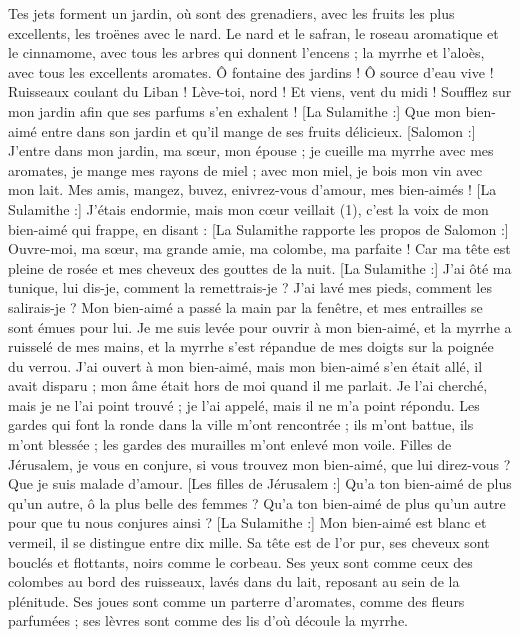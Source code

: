 \begin{multicols}{2}
Tes jets forment un jardin, où sont des grenadiers, avec les fruits les plus excellents, les troënes avec le nard.
Le nard et le safran, le roseau aromatique et le cinnamome, avec tous les arbres qui donnent l'encens ; la myrrhe et l'aloès, avec tous les excellents aromates.
Ô fontaine des jardins ! Ô source d'eau vive ! Ruisseaux coulant du Liban !
Lève-toi, nord ! Et viens, vent du midi ! Soufflez sur mon jardin afin que ses parfums s’en exhalent ! [La Sulamithe :] Que mon bien-aimé entre dans son jardin et qu'il mange de ses fruits délicieux.
\VerseOne{}[Salomon :] J’entre dans mon jardin, ma sœur, mon épouse ; je cueille ma myrrhe avec mes aromates, je mange mes rayons de miel ; avec mon miel, je bois mon vin avec mon lait. Mes amis, mangez, buvez, enivrez-vous d’amour, mes bien-aimés !
[La Sulamithe :] J'étais endormie, mais mon cœur veillait (1), c’est la voix de mon bien-aimé qui frappe, en disant : [La Sulamithe rapporte les propos de Salomon :] Ouvre-moi, ma sœur, ma grande amie, ma colombe, ma parfaite ! Car ma tête est pleine de rosée et mes cheveux des gouttes de la nuit.
[La Sulamithe :] J'ai ôté ma tunique, lui dis-je, comment la remettrais-je ? J'ai lavé mes pieds, comment les salirais-je ?
Mon bien-aimé a passé la main par la fenêtre, et mes entrailles se sont émues pour lui.
Je me suis levée pour ouvrir à mon bien-aimé, et la myrrhe a ruisselé de mes mains, et la myrrhe s’est répandue de mes doigts sur la poignée du verrou.
J'ai ouvert à mon bien-aimé, mais mon bien-aimé s'en était allé, il avait disparu ; mon âme était hors de moi quand il me parlait. Je l’ai cherché, mais je ne l’ai point trouvé ; je l'ai appelé, mais il ne m’a point répondu.
Les gardes qui font la ronde dans la ville m’ont rencontrée ; ils m’ont battue, ils m’ont blessée ; les gardes des murailles m'ont enlevé mon voile.
Filles de Jérusalem, je vous en conjure, si vous trouvez mon bien-aimé, que lui direz-vous ? Que je suis malade d’amour.
[Les filles de Jérusalem :] Qu'a ton bien-aimé de plus qu’un autre, ô la plus belle des femmes ? Qu'a ton bien-aimé de plus qu’un autre pour que tu nous conjures ainsi ?
[La Sulamithe :] Mon bien-aimé est blanc et vermeil, il se distingue entre dix mille.
Sa tête est de l’or pur, ses cheveux sont bouclés et flottants, noirs comme le corbeau.
Ses yeux sont comme ceux des colombes au bord des ruisseaux, lavés dans du lait, reposant au sein de la plénitude.
Ses joues sont comme un parterre d’aromates, comme des fleurs parfumées ; ses lèvres sont comme des lis d’où découle la myrrhe.

\end{multicols}
